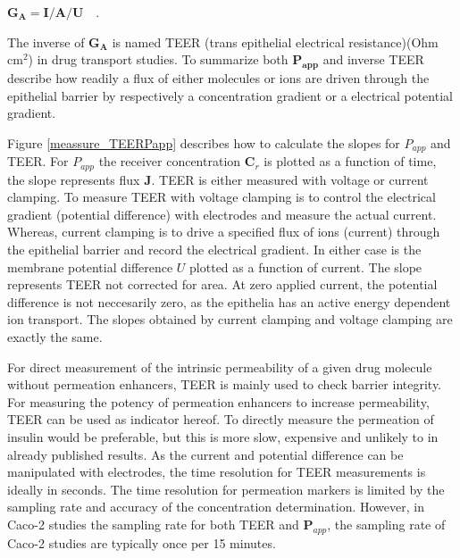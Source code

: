$\bm{G_A} = \bm{I} / \bm{A} / \bm{U} \quad .$

The inverse of $\bm{G_A}$ is named TEER (trans epithelial electrical resistance)(Ohm cm$^2$) in drug transport studies. To summarize both $\bm{P_{app}}$ and inverse TEER describe how readily a flux of either molecules or ions are driven through the epithelial barrier by respectively a concentration gradient or a electrical potential gradient. 

Figure \ref{meassure_TEERPapp} describes how to calculate the slopes for $P_{app}$ and TEER. For $P_{app}$  the receiver concentration $\bm{C}_r$ is plotted as a function of time, the slope represents flux $\bm{J}$. TEER is either measured with voltage or current clamping. To measure TEER with voltage clamping is to control the electrical gradient (potential difference) with electrodes and measure the actual current. Whereas, current clamping is to drive a specified flux of ions (current) through the epithelial barrier and record the electrical gradient. In either case is the membrane potential difference $U$ plotted as a function of current. The slope represents TEER not corrected for area. At zero applied current, the potential difference is not neccesarily zero, as the epithelia has an active energy dependent ion transport. The slopes obtained by current clamping and voltage clamping are exactly the same.

For direct measurement of the intrinsic permeability of a given drug molecule without permeation enhancers, TEER is mainly used to check barrier integrity. For measuring the potency of permeation enhancers to increase permeability, TEER can be used as indicator hereof. To directly measure the permeation of insulin would be preferable, but this is more slow, expensive and unlikely to in already published results. As the current and potential difference can be manipulated with electrodes, the time resolution for TEER measurements is ideally in seconds. The time resolution for permeation markers is limited by the sampling rate and accuracy of the concentration determination. However, in Caco-2 studies the sampling rate for both TEER and $\bm{P}_{app}$, the sampling rate of Caco-2 studies are typically once per 15 minutes.


